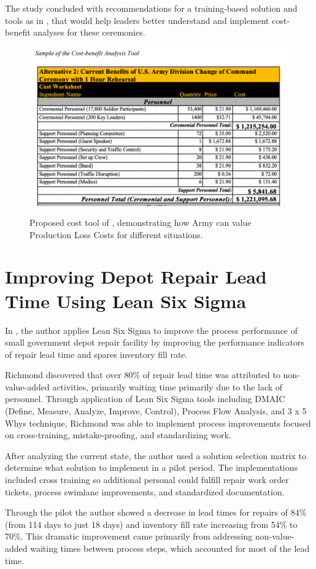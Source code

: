 \documentclass{article}
\begin{document}
			The study concluded with recommendations for a training-based solution and tools as in , that would help leaders better understand and implement cost-benefit analyses for these ceremonies. 
			
			\begin{figure}[htbp]
				\centering
				\includegraphics[width=0.4\linewidth,height=0.4\textheight,keepaspectratio]{figures/cost_tool.pdf}
				\caption{Proposed cost tool of \cite{Malin2020}, demonstrating how Army can value Production Loss Costs for different situations.}
				\label{fig:loss_tool}
			\end{figure}

		
		\section{Improving Depot Repair Lead Time Using Lean Six Sigma \cite{Richmond2023}}

			In \cite{Richmond2023}, the author applies Lean Six Sigma to improve the process performance of small government depot repair facility by improving the performance indicators of repair lead time and spares inventory fill rate.

			Richmond discovered that over 80\% of repair lead time was attributed to non-value-added activities, primarily waiting time primarily due to the lack of personnel.
			Through application of Lean Six Sigma tools including DMAIC (Define, Measure, Analyze, Improve, Control), Process Flow Analysis, and 3 x 5 Whys technique, Richmond was able to implement process improvements focused on cross-training, mistake-proofing, and standardizing work.

			After analyzing the current state, the author used a solution selection matrix to determine what solution to implement in a pilot period.
			The implementations included cross training so additional personal could fulfill repair work order tickets, process swimlane improvements, and standardized documentation.
 
			Through the pilot the author showed a decrease in lead times for repairs of 84\% (from 114 days to just 18 days) and inventory fill rate increasing from 54\% to 70\%. 
			This dramatic improvement came primarily from addressing non-value-added waiting times between process steps, which accounted for most of the lead time.
\end{document}
